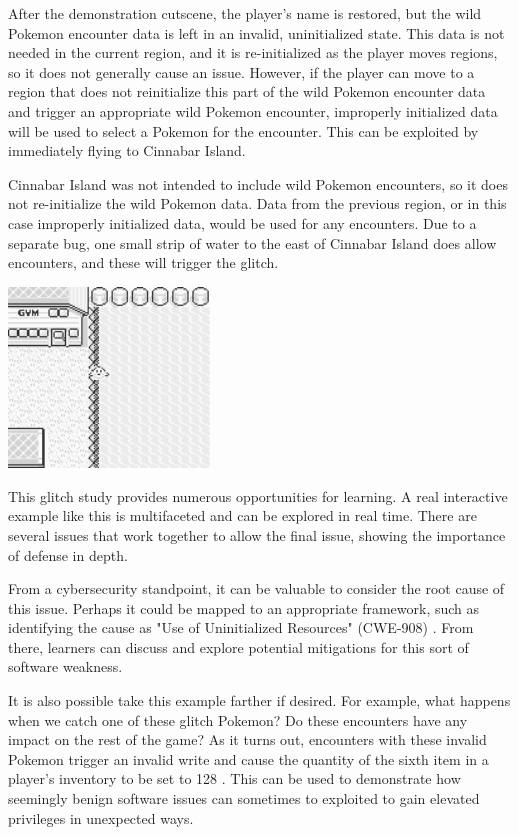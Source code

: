 \documentclass[letterpaper]{article}
\begin{document}
After the demonstration cutscene, the player's name is restored, but the wild Pokemon encounter data is left in an invalid, uninitialized state. This data is not needed in the current region, and it is re-initialized as the player moves regions, so it does not generally cause an issue. However, if the player can move to a region that does not reinitialize this part of the wild Pokemon encounter data and trigger an appropriate wild Pokemon encounter, improperly initialized data will be used to select a Pokemon for the encounter. This can be exploited by immediately flying to Cinnabar Island.

Cinnabar Island was not intended to include wild Pokemon encounters, so it does not re-initialize the wild Pokemon data. Data from the previous region, or in this case improperly initialized data, would be used for any encounters. Due to a separate bug, one small strip of water to the east of Cinnabar Island does allow encounters, and these will trigger the glitch.

\noindent %
\begin{minipage}{\textwidth}
    \centering
    \includegraphics[width=0.4\textwidth]{surfing.png}
    \label{fig:surfing}
\end{minipage}

This glitch study provides numerous opportunities for learning. A real interactive example like this is multifaceted and can be explored in real time. There are several issues that work together to allow the final issue, showing the importance of defense in depth.

From a cybersecurity standpoint, it can be valuable to consider the root cause of this issue. Perhaps it could be mapped to an appropriate framework, such as identifying the cause as "Use of Uninitialized Resources" (CWE-908) \cite{mitre2012}. From there, learners can discuss and explore potential mitigations for this sort of software weakness.

It is also possible take this example farther if desired. For example, what happens when we catch one of these glitch Pokemon? Do these encounters have any impact on the rest of the game? As it turns out, encounters with these invalid Pokemon trigger an invalid write and cause the quantity of the sixth item in a player's inventory to be set to 128 \cite{bulbapedia2010}. This can be used to demonstrate how seemingly benign software issues can sometimes to exploited to gain elevated privileges in unexpected ways.
\end{document}
